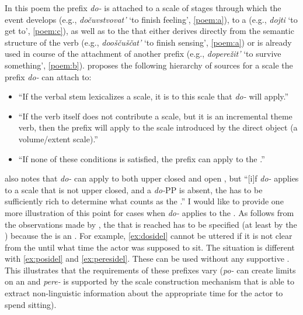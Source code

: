 In this poem the prefix \textit{do-} is attached to a scale of stages through which the event develops (e.g., \textit{do\v{c}uvstvovat'} `to finish feeling', \ref{poem:a}), to a  (e.g., \textit{dojti} `to get to', \ref{poem:c}), as well as to the  that either derives directly from the semantic structure of the verb (e.g., \textit{doo\v{s}\v{c}u\v{s}\v{c}at'} `to finish sensing', \ref{poem:a}) or is already used in course of the attachment of another prefix (e.g., \textit{dopere\v{z}it'} `to survive something', \ref{poem:b}). \citet{Kagan:book} proposes the following hierarchy of sources for a scale the prefix \textit{do-} can attach to: 

\begin{itemize}
\item ``If the verbal stem lexicalizes a scale, it is to this scale that \textit{do-} will apply.''
\item ``If the verb itself does not contribute a scale, but it is an incremental
theme verb, then the prefix will apply to the scale introduced by the direct object (a volume/extent scale).''
\item ``If none of these conditions is satisfied, the prefix can apply to the .''
\end{itemize}

\citet{Kagan:12} also notes that \textit{do-} can apply to both upper closed and open , but ``[i]f \textit{do-} applies to a scale that is not upper closed, and a \textit{do-}PP is absent, the  has to be sufficiently rich to determine what counts as the .'' I would like to provide one more illustration of this point for cases when \textit{do-} applies to the . As follows from the observations made by \citet{Kagan:12}, the  that is reached has to be specified (at least by the ) because the  is an . For example, \ref{ex:dosidel} cannot be uttered if it is not clear from the  until what time the actor was supposed to sit. The situation is different with \ref{ex:posidel} and \ref{ex:peresidel}. These can be used without any supportive . This illustrates that the requirements of these prefixes vary (\textit{po-} can create limits on an  and \textit{pere-} is supported by the scale construction mechanism that is able to extract non-linguistic information about the appropriate time for the actor to spend sitting).

